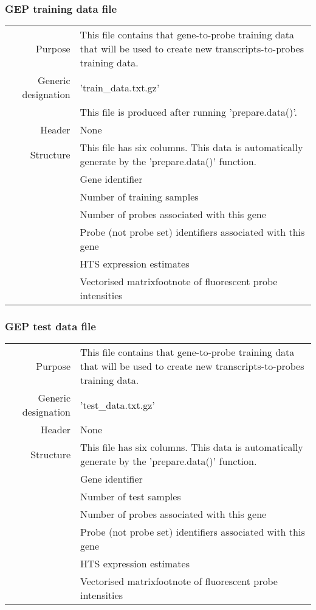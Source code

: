 \documentclass[a4paper,12pt]{article}
\begin{document}
\subsubsection{GEP training data file}

\begin{tabular}{rp{12cm}}
Purpose & This file contains that gene-to-probe training data that will be used to create new transcripts-to-probes training data. \\
Generic designation & 'train\_data.txt.gz' \\
  & This file is produced after running 'prepare.data()'. \\
Header & None \\
Structure & This file has six columns. This data is automatically generate by the 'prepare.data()' function. \\
  & Gene identifier \\
  & Number of training samples \\
  & Number of probes associated with this gene \\
  & Probe (not probe set) identifiers associated with this gene \\
  & HTS expression estimates \\
  & Vectorised matrix{footnote} of fluorescent probe intensities \\
\end{tabular}

\subsubsection{GEP test data file}

\begin{tabular}{rp{12cm}}
Purpose & This file contains that gene-to-probe training data that will be used to create new transcripts-to-probes training data. \\
Generic designation & 'test\_data.txt.gz' \\
Header & None \\
Structure & This file has six columns. This data is automatically generate by the 'prepare.data()' function. \\
  & Gene identifier \\
  & Number of test samples \\
  & Number of probes associated with this gene \\
  & Probe (not probe set) identifiers associated with this gene \\
  & HTS expression estimates \\
  & Vectorised matrix{footnote} of fluorescent probe intensities
\end{tabular}
\end{document}
